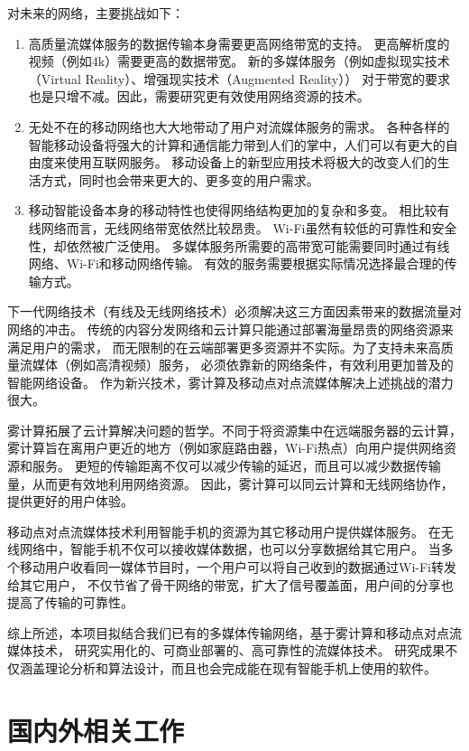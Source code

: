 对未来的网络，主要挑战如下：
\begin{enumerate}
\item 高质量流媒体服务的数据传输本身需要更高网络带宽的支持。
更高解析度的视频（例如4k）需要更高的数据带宽。
新的多媒体服务（例如虚拟现实技术（Virtual Reality）、增强现实技术（Augmented Reality））
对于带宽的要求也是只增不减。因此，需要研究更有效使用网络资源的技术。

\item 无处不在的移动网络也大大地带动了用户对流媒体服务的需求。
各种各样的智能移动设备将强大的计算和通信能力带到人们的掌中，人们可以有更大的自由度来使用互联网服务。
移动设备上的新型应用技术将极大的改变人们的生活方式，同时也会带来更大的、更多变的用户需求。

\item 移动智能设备本身的移动特性也使得网络结构更加的复杂和多变。
相比较有线网络而言，无线网络带宽依然比较昂贵。
Wi-Fi虽然有较低的可靠性和安全性，却依然被广泛使用。
多媒体服务所需要的高带宽可能需要同时通过有线网络、Wi-Fi和移动网络传输。
有效的服务需要根据实际情况选择最合理的传输方式。
\end{enumerate}

下一代网络技术（有线及无线网络技术）必须解决这三方面因素带来的数据流量对网络的冲击。
传统的内容分发网络和云计算只能通过部署海量昂贵的网络资源来满足用户的需求，
而无限制的在云端部署更多资源并不实际。为了支持未来高质量流媒体（例如高清视频）服务，
必须依靠新的网络条件，有效利用更加普及的智能网络设备。
作为新兴技术，雾计算及移动点对点流媒体解决上述挑战的潜力很大。

雾计算拓展了云计算解决问题的哲学。不同于将资源集中在远端服务器的云计算，
雾计算旨在离用户更近的地方（例如家庭路由器，Wi-Fi热点）向用户提供网络资源和服务。
更短的传输距离不仅可以减少传输的延迟，而且可以减少数据传输量，从而更有效地利用网络资源。
因此，雾计算可以同云计算和无线网络协作，提供更好的用户体验。

移动点对点流媒体技术利用智能手机的资源为其它移动用户提供媒体服务。
在无线网络中，智能手机不仅可以接收媒体数据，也可以分享数据给其它用户。
当多个移动用户收看同一媒体节目时，一个用户可以将自己收到的数据通过Wi-Fi转发给其它用户，
不仅节省了骨干网络的带宽，扩大了信号覆盖面，用户间的分享也提高了传输的可靠性。

综上所述，本项目拟结合我们已有的多媒体传输网络，基于雾计算和移动点对点流媒体技术，
研究实用化的、可商业部署的、高可靠性的流媒体技术。
研究成果不仅涵盖理论分析和算法设计，而且也会完成能在现有智能手机上使用的软件。

\section{国内外相关工作}

